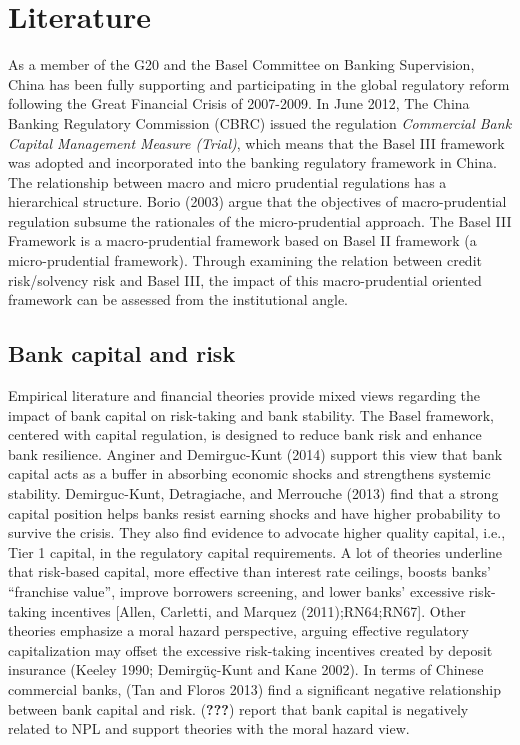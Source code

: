\documentclass{article}
\begin{document}
\hypertarget{literature}{%
\section{Literature}\label{literature}}

As a member of the G20 and the Basel Committee on Banking Supervision,
China has been fully supporting and participating in the global
regulatory reform following the Great Financial Crisis of 2007-2009. In
June 2012, The China Banking Regulatory Commission (CBRC) issued the
regulation \emph{Commercial Bank Capital Management Measure (Trial)},
which means that the Basel III framework was adopted and incorporated
into the banking regulatory framework in China. The relationship between
macro and micro prudential regulations has a hierarchical structure.
Borio (2003) argue that the objectives of macro-prudential regulation
subsume the rationales of the micro-prudential approach. The Basel III
Framework is a macro-prudential framework based on Basel II framework (a
micro-prudential framework). Through examining the relation between
credit risk/solvency risk and Basel III, the impact of this
macro-prudential oriented framework can be assessed from the
institutional angle.

\hypertarget{bank-capital-and-risk}{%
\subsection{Bank capital and risk}\label{bank-capital-and-risk}}

Empirical literature and financial theories provide mixed views
regarding the impact of bank capital on risk-taking and bank stability.
The Basel framework, centered with capital regulation, is designed to
reduce bank risk and enhance bank resilience. Anginer and Demirguc-Kunt
(2014) support this view that bank capital acts as a buffer in absorbing
economic shocks and strengthens systemic stability. Demirguc-Kunt,
Detragiache, and Merrouche (2013) find that a strong capital position
helps banks resist earning shocks and have higher probability to survive
the crisis. They also find evidence to advocate higher quality capital,
i.e., Tier 1 capital, in the regulatory capital requirements. A lot of
theories underline that risk-based capital, more effective than interest
rate ceilings, boosts banks' ``franchise value'', improve borrowers
screening, and lower banks' excessive risk-taking incentives {[}Allen,
Carletti, and Marquez (2011);RN64;RN67{]}. Other theories emphasize a
moral hazard perspective, arguing effective regulatory capitalization
may offset the excessive risk-taking incentives created by deposit
insurance (Keeley 1990; Demirgüç-Kunt and Kane 2002). In terms of
Chinese commercial banks, (Tan and Floros 2013) find a significant
negative relationship between bank capital and risk. ({\textbf{???}})
report that bank capital is negatively related to NPL and support
theories with the moral hazard view.
\end{document}
